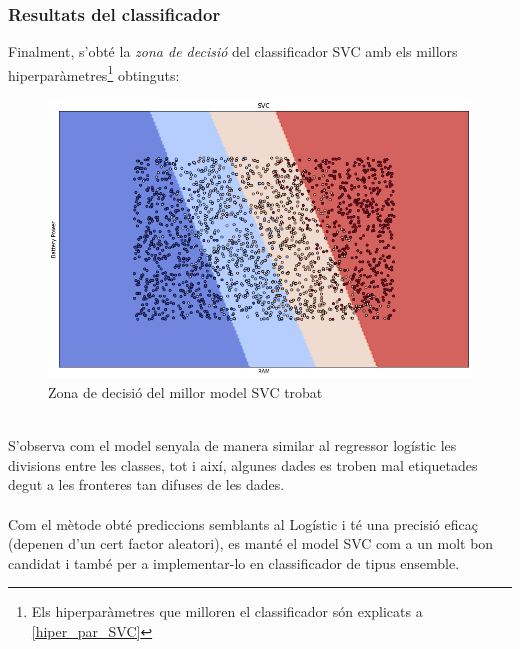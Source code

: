 \documentclass[a4paper, 11pt]{article}
\begin{document}
\subsubsection{Resultats del classificador}\label{zona_svc}
Finalment, s'obté la \textit{zona de decisió} del classificador SVC amb els millors hiperparàmetres\footnote{Els hiperparàmetres que milloren el classificador són explicats a \textcolor{blue}{\ref{hiper_par_SVC}}} obtinguts:\\
\begin{figure}[h]
    \centering
    \includegraphics[width = 1\textwidth]{ZonasModelos/zona_svc.png}
    \caption{Zona de decisió del millor model SVC trobat}
    \label{fig:my_label}
\end{figure}\\
S'observa com el model senyala de manera similar al regressor logístic les divisions entre les classes, tot i així, algunes dades es troben mal etiquetades degut a les fronteres tan difuses de les dades.\\\\
Com el mètode obté prediccions semblants al Logístic i té una precisió eficaç (depenen d'un cert factor aleatori), es manté el model SVC com a un molt bon candidat i també per a implementar-lo en classificador de tipus ensemble.
\newpage
\end{document}
